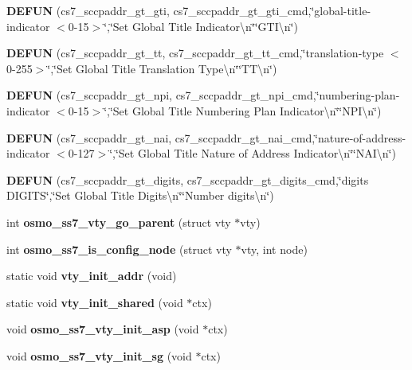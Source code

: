 \begin{DoxyCompactItemize}
\item 
{\bf D\+E\+F\+UN} (cs7\+\_\+sccpaddr\+\_\+gt\+\_\+gti, cs7\+\_\+sccpaddr\+\_\+gt\+\_\+gti\+\_\+cmd,\char`\"{}global-\/title-\/indicator $<$0-\/15$>$\char`\"{},\char`\"{}Set Global Title Indicator\textbackslash{}n\char`\"{}\char`\"{}G\+T\+I\textbackslash{}n\char`\"{})
\item 
{\bf D\+E\+F\+UN} (cs7\+\_\+sccpaddr\+\_\+gt\+\_\+tt, cs7\+\_\+sccpaddr\+\_\+gt\+\_\+tt\+\_\+cmd,\char`\"{}translation-\/type $<$0-\/255$>$\char`\"{},\char`\"{}Set Global Title Translation Type\textbackslash{}n\char`\"{}\char`\"{}T\+T\textbackslash{}n\char`\"{})
\item 
{\bf D\+E\+F\+UN} (cs7\+\_\+sccpaddr\+\_\+gt\+\_\+npi, cs7\+\_\+sccpaddr\+\_\+gt\+\_\+npi\+\_\+cmd,\char`\"{}numbering-\/plan-\/indicator $<$0-\/15$>$\char`\"{},\char`\"{}Set Global Title Numbering Plan Indicator\textbackslash{}n\char`\"{}\char`\"{}N\+P\+I\textbackslash{}n\char`\"{})
\item 
{\bf D\+E\+F\+UN} (cs7\+\_\+sccpaddr\+\_\+gt\+\_\+nai, cs7\+\_\+sccpaddr\+\_\+gt\+\_\+nai\+\_\+cmd,\char`\"{}nature-\/of-\/address-\/indicator $<$0-\/127$>$\char`\"{},\char`\"{}Set Global Title Nature of Address Indicator\textbackslash{}n\char`\"{}\char`\"{}N\+A\+I\textbackslash{}n\char`\"{})
\item 
{\bf D\+E\+F\+UN} (cs7\+\_\+sccpaddr\+\_\+gt\+\_\+digits, cs7\+\_\+sccpaddr\+\_\+gt\+\_\+digits\+\_\+cmd,\char`\"{}digits D\+I\+G\+I\+TS\char`\"{},\char`\"{}Set Global Title Digits\textbackslash{}n\char`\"{}\char`\"{}Number digits\textbackslash{}n\char`\"{})
\item 
int {\bf osmo\+\_\+ss7\+\_\+vty\+\_\+go\+\_\+parent} (struct vty $\ast$vty)
\item 
int {\bf osmo\+\_\+ss7\+\_\+is\+\_\+config\+\_\+node} (struct vty $\ast$vty, int node)
\item 
static void {\bf vty\+\_\+init\+\_\+addr} (void)
\item 
static void {\bf vty\+\_\+init\+\_\+shared} (void $\ast$ctx)
\item 
void {\bf osmo\+\_\+ss7\+\_\+vty\+\_\+init\+\_\+asp} (void $\ast$ctx)
\item 
void {\bf osmo\+\_\+ss7\+\_\+vty\+\_\+init\+\_\+sg} (void $\ast$ctx)
\end{DoxyCompactItemize}
